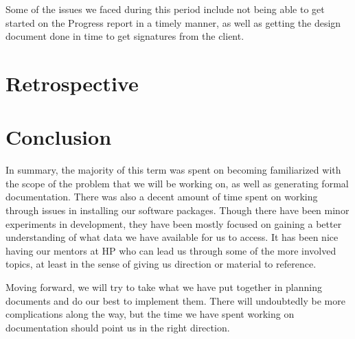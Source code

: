 \documentclass[draftclsnofoot, onecolumn, compsoc, 10pt]{IEEEtran}
\begin{document}
Some of the issues we faced during this period include not being able to get started on the Progress report in a timely manner, as well as getting the design document done in time to get signatures from the client.





\section{Retrospective}
\bgroup
\def\arraystretch{1.5}
\egroup

\section{Conclusion}
In summary, the majority of this term was spent on becoming familiarized with the scope of the problem that we will be working on, as well as generating formal documentation.
There was also a decent amount of time spent on working through issues in installing our software packages.
Though there have been minor experiments in development, they have been mostly focused on gaining a better understanding of what data we have available for us to access.
It has been nice having our mentors at HP who can lead us through some of the more involved topics, at least in the sense of giving us direction or material to reference.

Moving forward, we will try to take what we have put together in planning documents and do our best to implement them. There will undoubtedly be more complications along the way, but the time we have spent working on documentation should point us in the right direction.
\end{document}
